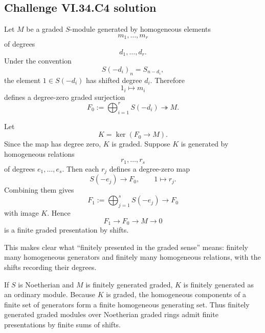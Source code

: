 \subsection*{Challenge VI.34.C4 solution}
\begin{solution}
Let \(M\) be a graded \(S\)-module generated by homogeneous elements
\[
m_1,\ldots,m_r
\]
of degrees
\[
d_1,\ldots,d_r.
\]
Under the convention
\[
S(-d_i)_n=S_{n-d_i},
\]
the element \(1\in S(-d_i)\) has shifted degree \(d_i\). Therefore
\[
1_i\longmapsto m_i
\]
defines a degree-zero graded surjection
\[
F_0:=\bigoplus_{i=1}^rS(-d_i)\twoheadrightarrow M.
\]

Let
\[
K=\ker(F_0\to M).
\]
Since the map has degree zero, \(K\) is graded. Suppose \(K\) is generated by homogeneous relations
\[
r_1,\ldots,r_s
\]
of degrees \(e_1,\ldots,e_s\). Then each \(r_j\) defines a degree-zero map
\[
S(-e_j)\longrightarrow F_0,
\qquad
1\longmapsto r_j.
\]
Combining them gives
\[
F_1:=\bigoplus_{j=1}^sS(-e_j)\longrightarrow F_0
\]
with image \(K\). Hence
\[
\boxed{
F_1\longrightarrow F_0\longrightarrow M\longrightarrow0
}
\]
is a finite graded presentation by shifts.

This makes clear what ``finitely presented in the graded sense'' means: finitely many homogeneous generators and
finitely many homogeneous relations, with the shifts recording their degrees.

If \(S\) is Noetherian and \(M\) is finitely generated graded, \(K\) is finitely generated as an ordinary module.
Because \(K\) is graded, the homogeneous components of a finite set of generators form a finite homogeneous
generating set. Thus finitely generated graded modules over Noetherian graded rings admit finite presentations by
finite sums of shifts.
\end{solution}

